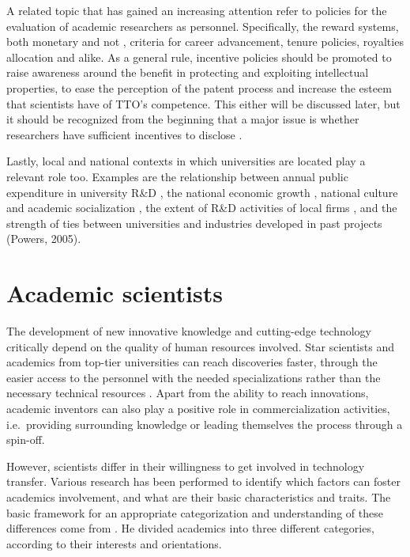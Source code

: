 A related topic that has gained an increasing attention refer to policies for the evaluation of academic researchers as personnel. Specifically, the reward systems, both monetary and not \citep{Guerrero2014}, criteria for career advancement, tenure policies, royalties allocation and alike. As a general rule, incentive policies should be promoted to raise awareness around the benefit in protecting and exploiting intellectual properties, to ease the perception of the patent process and increase the esteem that scientists have of TTO's competence. This either will be discussed later, but it should be recognized from the beginning that a major issue is whether researchers have sufficient incentives to disclose \citep{Debackere2005}.

Lastly, local and national contexts in which universities are located play a relevant role too. Examples are the relationship between annual public expenditure in university R\&D \citep{OShea2005}, the national economic growth \citep{Siegel2003a}, national culture and academic socialization \citep{Bercovitz2006}, the extent of R\&D activities of local firms \citep{Siegel2003a}, and the strength of ties between universities and industries developed in past projects (Powers, 2005). 

\section{Academic scientists}

The development of new innovative knowledge and cutting-edge technology critically depend on the quality of human resources involved. Star scientists and academics from top-tier universities can reach discoveries faster, through the easier access to the personnel with the needed specializations rather than the necessary technical resources \citep{OShea2005}. Apart from the ability to reach innovations, academic inventors can also play a positive role in commercialization activities, i.e.\ providing surrounding knowledge or leading themselves the process through a spin-off.

However, scientists differ in their willingness to get involved in technology transfer. Various research has been performed to identify which factors can foster academics involvement, and what are their basic characteristics and traits. The basic framework for an appropriate categorization and understanding of these differences come from \citet{Stokes1997}. He divided academics into three different categories, according to their interests and orientations. 

